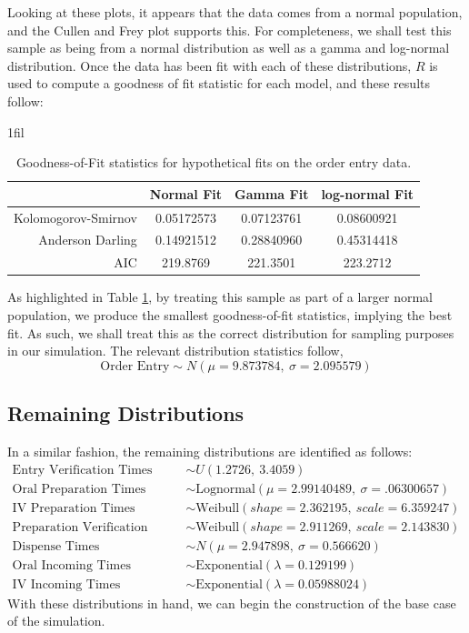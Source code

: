 \documentclass[10pt]{report}            %
\makeatletter
\newcommand*{\centerfloat}{%
  \parindent \z@
  \leftskip \z@ \@plus 1fil \@minus \textwidth
  \rightskip\leftskip
  \parfillskip \z@skip}
\makeatother
\begin{document}
Looking at these plots, it appears that the data comes from a normal population, and the Cullen and Frey plot supports this. For completeness, we shall test this sample as being from a normal distribution as well as a gamma and log-normal distribution. Once the data has been fit with each of these distributions, $R$ is used to compute a goodness of fit statistic for each model, and these results follow:
\begin{table}[H]
\centerfloat
\begin{tabular}{|r||c|c|c|}
\hline
& Normal Fit & Gamma Fit & log-normal Fit \\\hline
Kolomogorov-Smirnov & \cellcolor{green!25}0.05172573 & 0.07123761 & 0.08600921\\\hline
Anderson Darling & \cellcolor{green!25}0.14921512 & 0.28840960 & 0.45314418\\\hline
AIC & \cellcolor{green!25}219.8769 & 221.3501 & 223.2712\\\hline
\end{tabular}
\caption{Goodness-of-Fit statistics for hypothetical fits on the order entry data.}
\label{table:entryGOF}
\end{table}
As highlighted in Table \ref{table:entryGOF}, by treating this sample as part of a larger normal population, we produce the smallest goodness-of-fit statistics, implying the best fit. As such, we shall treat this as the correct distribution for sampling purposes in our simulation. The relevant distribution statistics follow,
\[\text{Order Entry}\sim N(\mu=9.873784,\ \sigma=2.095579)\]
\subsection*{Remaining Distributions}
In a similar fashion, the remaining distributions are identified as follows:
\begin{align*}
\text{Entry Verification Times} &\sim U(1.2726,\ 3.4059)\\
\text{Oral Preparation Times} &\sim \text{Lognormal}(\mu=2.99140489,\ \sigma=.06300657)\\
\text{IV Preparation Times} &\sim \text{Weibull}(shape=2.362195,\ scale=6.359247)\\
\text{Preparation Verification Times} &\sim \text{Weibull}(shape=2.911269,\ scale=2.143830)\\
\text{Dispense Times} &\sim N(\mu=2.947898,\ \sigma=0.566620)\\
\text{Oral Incoming Times} &\sim \text{Exponential}(\lambda = 0.129199 )\\
\text{IV Incoming Times} &\sim \text{Exponential}(\lambda = 0.05988024 )
\end{align*}
With these distributions in hand, we can begin the construction of the base case of the simulation.
\end{document}
